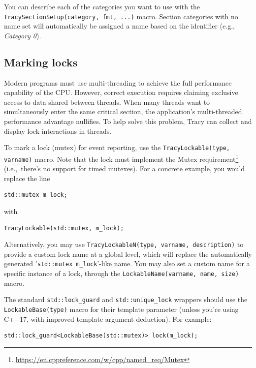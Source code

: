 \documentclass[hidelinks,titlepage,a4paper,twoside]{article}
\begin{document}
You can describe each of the categories you want to use with the \texttt{TracySectionSetup(category, fmt, ...)} macro. Section categories with no name set will automatically be assigned a name based on the identifier (e.g., \emph{Category 0}).

\subsection{Marking locks}

Modern programs must use multi-threading to achieve the full performance capability of the CPU. However, correct execution requires claiming exclusive access to data shared between threads. When many threads want to simultaneously enter the same critical section, the application's multi-threaded performance advantage nullifies. To help solve this problem, Tracy can collect and display lock interactions in threads.

To mark a lock (mutex) for event reporting, use the \texttt{TracyLockable(type, varname)} macro. Note that the lock must implement the Mutex requirement\footnote{\url{https://en.cppreference.com/w/cpp/named_req/Mutex}} (i.e.,\ there's no support for timed mutexes). For a concrete example, you would replace the line

\begin{lstlisting}
std::mutex m_lock;
\end{lstlisting}

with

\begin{lstlisting}
TracyLockable(std::mutex, m_lock);
\end{lstlisting}

Alternatively, you may use \texttt{TracyLockableN(type, varname, description)} to provide a custom lock name at a global level, which will replace the automatically generated '\texttt{std::mutex m\_lock}'-like name. You may also set a custom name for a specific instance of a lock, through the \texttt{LockableName(varname, name, size)} macro.

The standard \texttt{std::lock\_guard} and \texttt{std::unique\_lock} wrappers should use the \texttt{LockableBase(type)} macro for their template parameter (unless you're using C++17, with improved template argument deduction). For example:

\begin{lstlisting}
std::lock_guard<LockableBase(std::mutex)> lock(m_lock);
\end{lstlisting}
\end{document}
